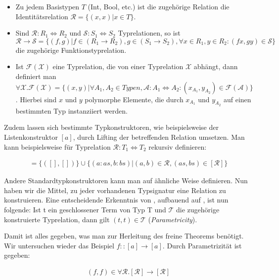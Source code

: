 \documentclass[11pt]{article} %
\begin{document}
\begin{itemize}
\item Zu jedem Basistypen $T$ (Int, Bool, etc.) ist die zugehörige Relation die Identitätsrelation $\mathcal{R} = \{ (x, x) | x \in T\}$.
\item Sind $\mathcal{R} : R_1 \Leftrightarrow R_2$ und $\mathcal{S} : S_1 \Leftrightarrow S_2$ Typrelationen, so ist $\mathcal{R} \rightarrow \mathcal{S} = \{ (f, g) | f \in (R_1 \rightarrow R_2), g \in (S_1 \rightarrow S_2), \forall x \in R_1, y \in R_2: (f x, g y) \in \mathcal{S} \}$ die zugehörige Funktionstyprelation.
\item Ist $\mathcal{F}(\mathcal{X})$ eine Typrelation, die von einer Typrelation $\mathcal{X}$ abhängt, dann definiert man
$\forall \mathcal{X} . \mathcal{F}(\mathcal{X}) = \{ (x, y) | \forall A_1, A_2 \in Typen, \mathcal{A} : A_1 \Leftrightarrow A_2: 
(x_{A_1}, y_{A_2}) \in \mathcal{F}(\mathcal{A}) \}$. Hierbei sind $x$ und $y$ polymorphe Elemente, die durch $x_{A_1}$ und $y_{A_2}$
auf einen bestimmten Typ instanziiert werden.
\end{itemize}

Zudem lassen sich bestimmte Typkonstruktoren, wie beispielsweise der Listenkonstruktor $[a]$, durch Lifting der betreffenden
Relation umsetzen. Man kann beispielsweise für Typrelation $\mathcal{R} : T_1 \Leftrightarrow T_2$ rekursiv definieren:

\begin{align}
[\mathcal{R}] = \{ ([], []) \} \cup \{ (a : as, b : bs) | (a, b) \in \mathcal{R}, (as, bs) \in [\mathcal{R}] \}
\end{align}

Andere Standardtypkonstruktoren kann man auf ähnliche Weise definieren. Nun haben wir die Mittel, zu jeder vorhandenen
Typsignatur eine Relation zu konstruieren. Eine entscheidende Erkenntnis von \cite{wadler}, aufbauend auf
\cite{reynolds}, ist nun folgende: Ist t ein geschlossener Term von Typ T und $\mathcal{T}$ die zugehörige konstruierte
Typrelation, dann gilt $(t, t) \in \mathcal{T}$ (\textit{Parametricity}).

Damit ist alles gegeben, was man zur Herleitung des freine Theorems benötigt. Wir untersuchen wieder das Beispiel
$f :: [a] \rightarrow [a]$. Durch Parametrizität ist gegeben:

\begin{align}
(f, f) \in \forall \mathcal{R} . [\mathcal{R}] \rightarrow [\mathcal{R}]
\end{align}
\end{document}
